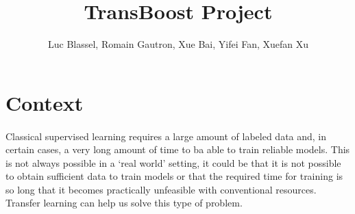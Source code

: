 \documentclass[11 pt]{article}
\title{TransBoost Project}
\author{Luc Blassel, Romain Gautron, Xue Bai, Yifei Fan, Xuefan Xu}
\begin{document}
\maketitle

\tableofcontents
\newpage

\section{Context}
\paragraph{}Classical supervised learning requires a large amount of labeled data and, in certain cases, a very long amount of time to ba able to train reliable models. This is not always possible in a `real world' setting, it could be that it is not possible to obtain sufficient data to train models or that the required time for training is so long that it becomes practically unfeasible with conventional resources. Transfer learning can help us solve this type of problem. 

\end{document}

